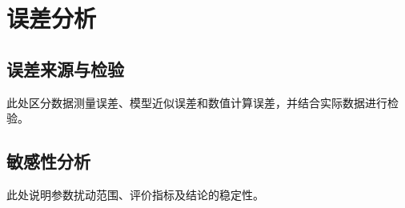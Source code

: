 \section{误差分析}
\subsection{误差来源与检验}
此处区分数据测量误差、模型近似误差和数值计算误差，并结合实际数据进行检验。

\subsection{敏感性分析}
此处说明参数扰动范围、评价指标及结论的稳定性。
